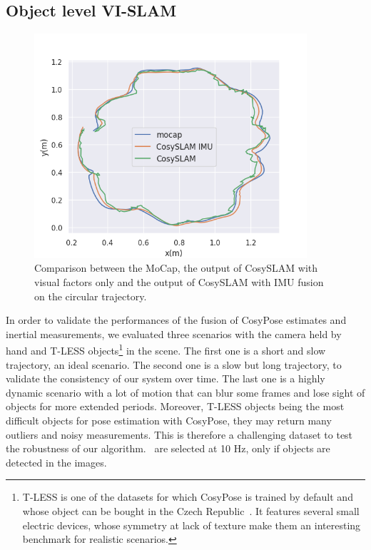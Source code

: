 \subsection{Object level VI-SLAM}

\begin{figure}[h]
  \centering
  \includegraphics[width=0.9\textwidth]{figures/cosyslam/trajectory_circular.png}
  \caption{Comparison between the MoCap, the output of CosySLAM with visual factors only and the output of CosySLAM with IMU fusion on the circular trajectory.}
  \label{fig:traj_circular}
\end{figure}

In order to validate the performances of the fusion of CosyPose estimates and inertial measurements, we evaluated three scenarios with the camera held by hand and 
T-LESS objects\footnote{T-LESS is one of the datasets for which CosyPose is trained by default and whose object can be bought in the Czech Republic~\cite{hodan17t}. 
It features several small electric devices, whose symmetry at lack of texture make them an interesting benchmark for realistic scenarios.} in the scene. 
The first one is a short and slow trajectory, \ie an ideal scenario. The second one is a slow but long trajectory, to validate the consistency of our system over time. 
The last one is a highly dynamic scenario with a lot of motion that can blur some frames and lose sight of objects for more extended periods. 
Moreover, T-LESS objects being the most difficult objects for pose estimation with CosyPose, they may return many outliers and noisy measurements. 
This is therefore a challenging dataset to test the robustness of our algorithm. \Keyframes\ are selected at 10 Hz, only if objects are detected in the images.


